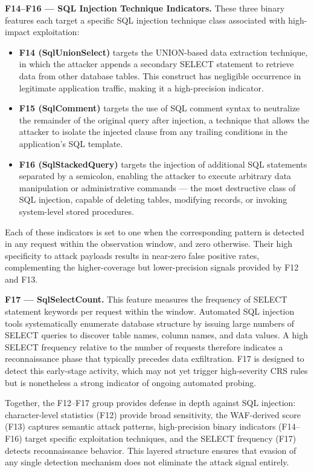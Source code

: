 \documentclass[12pt,a4paper]{report}
\begin{document}
\textbf{F14--F16 --- SQL Injection Technique Indicators.} These three binary features each target a specific SQL injection technique class associated with high-impact exploitation:
\begin{itemize}
  \item \textbf{F14 (SqlUnionSelect)} targets the UNION-based data extraction technique, in which the attacker appends a secondary SELECT statement to retrieve data from other database tables. This construct has negligible occurrence in legitimate application traffic, making it a high-precision indicator.
  \item \textbf{F15 (SqlComment)} targets the use of SQL comment syntax to neutralize the remainder of the original query after injection, a technique that allows the attacker to isolate the injected clause from any trailing conditions in the application's SQL template.
  \item \textbf{F16 (SqlStackedQuery)} targets the injection of additional SQL statements separated by a semicolon, enabling the attacker to execute arbitrary data manipulation or administrative commands --- the most destructive class of SQL injection, capable of deleting tables, modifying records, or invoking system-level stored procedures.
\end{itemize}
Each of these indicators is set to one when the corresponding pattern is detected in any request within the observation window, and zero otherwise. Their high specificity to attack payloads results in near-zero false positive rates, complementing the higher-coverage but lower-precision signals provided by F12 and F13.

\textbf{F17 --- SqlSelectCount.} This feature measures the frequency of SELECT statement keywords per request within the window. Automated SQL injection tools systematically enumerate database structure by issuing large numbers of SELECT queries to discover table names, column names, and data values. A high SELECT frequency relative to the number of requests therefore indicates a reconnaissance phase that typically precedes data exfiltration. F17 is designed to detect this early-stage activity, which may not yet trigger high-severity CRS rules but is nonetheless a strong indicator of ongoing automated probing.

Together, the F12--F17 group provides defense in depth against SQL injection: character-level statistics (F12) provide broad sensitivity, the WAF-derived score (F13) captures semantic attack patterns, high-precision binary indicators (F14--F16) target specific exploitation techniques, and the SELECT frequency (F17) detects reconnaissance behavior. This layered structure ensures that evasion of any single detection mechanism does not eliminate the attack signal entirely.
\end{document}
